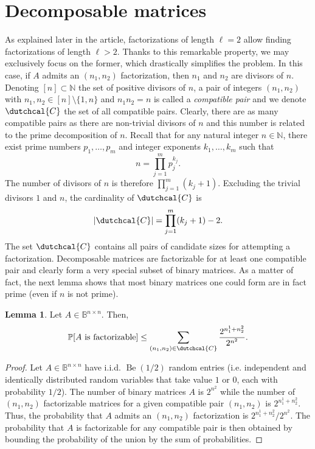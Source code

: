 \documentclass{article}
\numberwithin{equation}{section}
\theoremstyle{definition}
\newtheorem{lemma}[definition]{Lemma}
\begin{document}
\section{Decomposable matrices}
\label{se: decomposable_matrices}
As explained later in the article, factorizations of length $\ell=2$ allow finding factorizations of length $\ell>2$. Thanks to this remarkable property, we may exclusively focus on the former, which drastically simplifies the problem. In this case, if $A$ admits an $(n_1,n_2)$ factorization, then $n_1$ and $n_2$ are divisors of $n$. Denoting $[n] \subset \mathbb{N}$ the set of positive divisors of $n$, a pair of integers $(n_1,n_2)$ with $n_1, n_2 \in [n] \setminus \{1,n\}$ and $n_1n_2=n$ is called a \emph{compatible pair} and we denote $\dutchcal{C}$ the set of all compatible pairs. Clearly, there are as many compatible pairs as there are non-trivial divisors of $n$ and this number is related to the prime decomposition of $n$. Recall that for any natural integer $n \in \mathbb{N}$, there exist prime numbers $p_1,\dots,p_m$ and integer exponents $k_1,\dots,k_m$ such that
\begin{equation*}
    n = \prod_{j=1}^m p_j^{k_j}.
\end{equation*}
The number of divisors of $n$ is therefore $\prod_{j=1}^m (k_j+1)$. Excluding the trivial divisors $1$ and $n$, the cardinality of $\dutchcal{C}$ is
\begin{equation*}
    |\dutchcal{C}| = \prod_{j=1}^m (k_j+1) - 2.
\end{equation*}
The set $\dutchcal{C}$ contains all pairs of candidate sizes for attempting a factorization. Decomposable matrices are factorizable for at least one compatible pair and clearly form a very special subset of binary matrices. As a matter of fact, the next lemma shows that most binary matrices one could form are in fact prime (even if $n$ is not prime).

\begin{lemma}
\label{lem: random_matrix_factorizability}
Let $A \in \mathbb{B}^{n \times n}$. Then,
\begin{equation*}
    \mathbb{P}[A \text{ is factorizable}] \leq \sum_{(n_1,n_2) \in \dutchcal{C}} \frac{2^{n_1^1+n_2^2}}{2^{n^2}}.
\end{equation*}
\end{lemma}
\begin{proof}
Let $A \in \mathbb{B}^{n \times n}$ have i.i.d. $\operatorname{Be}(1/2)$ random entries (i.e. independent and identically distributed random variables that take value $1$ or $0$, each with probability $1/2$). The number of binary matrices $A$ is $2^{n^2}$ while the number of $(n_1,n_2)$ factorizable matrices for a given compatible pair $(n_1,n_2)$ is $2^{n_1^1+n_2^2}$. Thus, the probability that $A$ admits an $(n_1,n_2)$ factorization is $2^{n_1^1+n_2^2}/2^{n^2}$. The probability that $A$ is factorizable for any compatible pair is then obtained by bounding the probability of the union by the sum of probabilities.
\end{proof}
\end{document}
